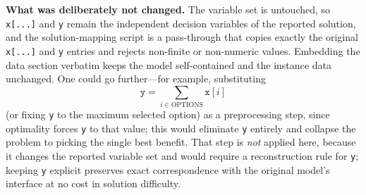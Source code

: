 \documentclass{article}
\begin{document}
\textbf{What was deliberately not changed.}
The variable set is untouched, so \texttt{x[...]} and \texttt{y} remain the independent decision variables of the reported solution, and the solution-mapping script is a pass-through that copies exactly the original \texttt{x[...]} and \texttt{y} entries and rejects non-finite or non-numeric values. Embedding the data section verbatim keeps the model self-contained and the instance data unchanged. One could go further---for example, substituting
\[
  \mathtt{y} = \sum_{i\in\mathrm{OPTIONS}} \mathtt{x}[i]
\]
(or fixing \texttt{y} to the maximum selected option) as a preprocessing step, since optimality forces \texttt{y} to that value; this would eliminate \texttt{y} entirely and collapse the problem to picking the single best benefit. That step is \emph{not} applied here, because it changes the reported variable set and would require a reconstruction rule for \texttt{y}; keeping \texttt{y} explicit preserves exact correspondence with the original model's interface at no cost in solution difficulty.
\end{document}
